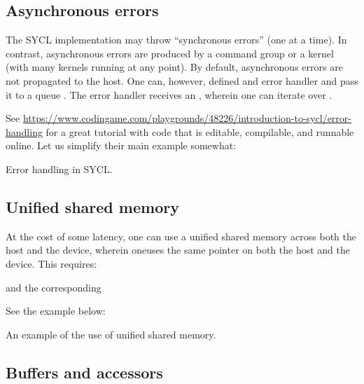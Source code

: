 \subsection{Asynchronous errors}

The SYCL implementation may throw ``synchronous errors'' (one at a time).
In contrast, asynchronous errors are produced by a command group or a kernel (with many kernels running at any point). By default, asynchronous errors are not propagated to the host. One can, however, defined and error handler and pass it to a queue .
The error handler receives an , wherein one can iterate over .

See \url{https://www.codingame.com/playgrounds/48226/introduction-to-sycl/error-handling} for a great tutorial with code that is editable, compilable, and runnable online. Let us simplify their main example somewhat:

\raggedbottom
\begin{codebox}[]{\href{https://godbolt.org/z/h3aodW99P}{\ExternalLink}}
\footnotesize Error handling in SYCL.
\tcblower
{}
\end{codebox}
  
\subsection{Unified shared memory}
 
At the cost of some latency, one can use a unified shared memory across both the host and the device, wherein oneuses the same pointer on both the host and the device. This requires:
 

and the corresponding 


See the example below:
\raggedbottom
\begin{codebox}[]{\href{https://godbolt.org/z/hc1f9Pnj5}{\ExternalLink}}
\footnotesize An example of the use of unified shared memory.
\tcblower
{}
\end{codebox}
 
\subsection{Buffers and accessors}

